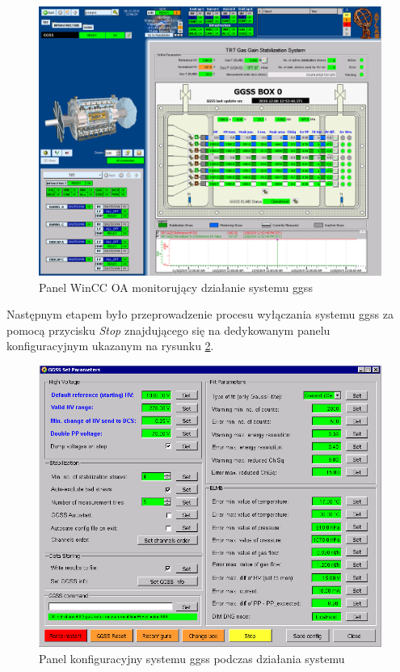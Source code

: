 \begin{figure}[H]
\centering
\includegraphics[width=\textwidth]{res/png/ggssStraw}
\caption{Panel WinCC OA monitorujący działanie systemu \gls*{ggss}}
\label{fig:ggss}
\end{figure}

\newpage
Następnym etapem było przeprowadzenie procesu wyłączania systemu \gls*{ggss} za pomocą przycisku \textit{Stop} znajdującego się na dedykowanym panelu konfiguracyjnym ukazanym na rysunku \ref{fig:ggsspanel}. 

\begin{figure}[H]
\centering
\includegraphics[width=\textwidth]{res/png/ggssConfig}
\caption{Panel konfiguracyjny systemu \gls*{ggss} podczas działania systemu}
\label{fig:ggsspanel}
\end{figure}


